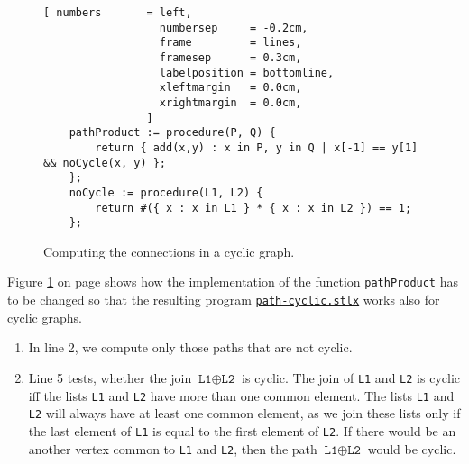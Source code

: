 \begin{figure}[!ht]
  \centering
\begin{Verbatim}[ numbers       = left,
                  numbersep     = -0.2cm,
                  frame         = lines, 
                  framesep      = 0.3cm, 
                  labelposition = bottomline,
                  xleftmargin   = 0.0cm,
                  xrightmargin  = 0.0cm,
                ]
    pathProduct := procedure(P, Q) {
        return { add(x,y) : x in P, y in Q | x[-1] == y[1] && noCycle(x, y) };
    };
    noCycle := procedure(L1, L2) {
        return #({ x : x in L1 } * { x : x in L2 }) == 1;
    };
\end{Verbatim} 
\vspace*{-0.3cm}
\caption{Computing the connections in a cyclic graph.}  
\label{fig:path-cyclic.stlx}
\end{figure} %

Figure \ref{fig:path-cyclic.stlx} on page shows how the implementation of the function
\texttt{pathProduct} has to be changed so that the resulting program
\href{https://github.com/karlstroetmann/Logik/blob/master/SetlX/path-cyclic.stlx}{\texttt{path-cyclic.stlx}}
works also for cyclic graphs. 
\begin{enumerate}
\item In line 2, we compute only those paths that are not cyclic.
\item Line 5 tests, whether the join  $\texttt{L1} \oplus \texttt{L2}$ is cyclic.  The join
      of \texttt{L1} and \texttt{L2} is cyclic iff the lists \texttt{L1} and \texttt{L2} have more
      than one common element. 
      The lists \texttt{L1} and \texttt{L2} will always have at least one common element, as we join
      these lists only if the last element of \texttt{L1} is equal to the first element of  \texttt{L2}.
      If there would be an another vertex common to \texttt{L1} and \texttt{L2}, then the path
      $\texttt{L1} \oplus \texttt{L2}$ would be cyclic.
\end{enumerate}

